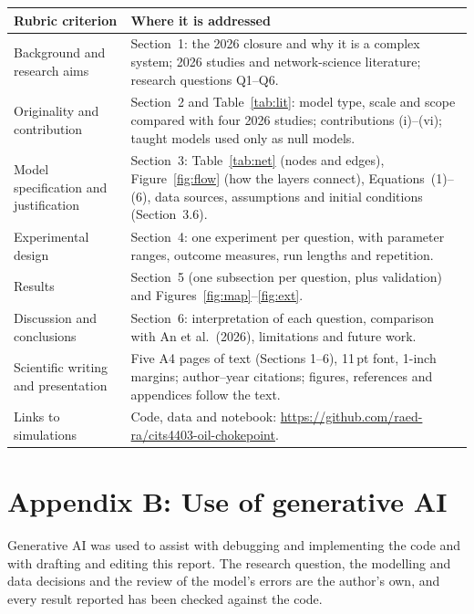 \documentclass[11pt,a4paper]{article}
\begin{document}
{\small
\renewcommand{\arraystretch}{1.15}
\begin{tabularx}{\textwidth}{@{}>{\raggedright\arraybackslash}p{4.2cm}>{\raggedright\arraybackslash}X@{}}
\toprule
\textbf{Rubric criterion} & \textbf{Where it is addressed} \\ \midrule
Background and research aims & Section~1: the 2026 closure and why it is a complex system; 2026 studies and network-science literature; research questions Q1--Q6. \\
Originality and contribution & Section~2 and Table~\ref{tab:lit}: model type, scale and scope compared with four 2026 studies; contributions (i)--(vi); taught models used only as null models. \\
Model specification and justification & Section~3: Table~\ref{tab:net} (nodes and edges), Figure~\ref{fig:flow} (how the layers connect), Equations~(1)--(6), data sources, assumptions and initial conditions (Section~3.6). \\
Experimental design & Section~4: one experiment per question, with parameter ranges, outcome measures, run lengths and repetition. \\
Results & Section~5 (one subsection per question, plus validation) and Figures~\ref{fig:map}--\ref{fig:ext}. \\
Discussion and conclusions & Section~6: interpretation of each question, comparison with An et al.\ (2026), limitations and future work. \\
Scientific writing and presentation & Five A4 pages of text (Sections 1--6), 11\,pt font, 1-inch margins; author--year citations; figures, references and appendices follow the text. \\
Links to simulations & Code, data and notebook: \url{https://github.com/raed-ra/cits4403-oil-chokepoint}. \\
\bottomrule
\end{tabularx}}

\section*{Appendix B: Use of generative AI}

Generative AI was used to assist with debugging and implementing the code and with drafting and editing this report. The research question, the modelling and data decisions and the review of the model's errors are the author's own, and every result reported has been checked against the code.
\end{document}
